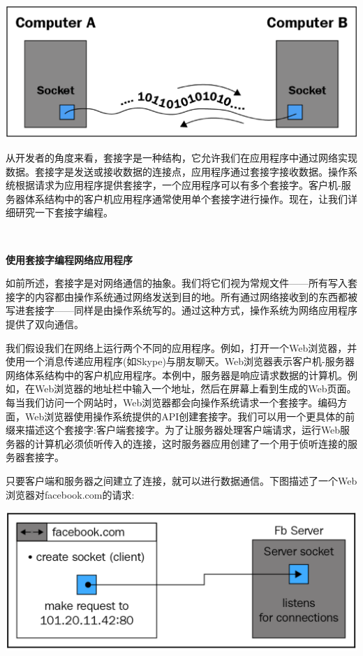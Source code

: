 \begin{center}
	\includegraphics[width=1.0\textwidth]{content/Section-2/Chapter-12/4}
\end{center}

从开发者的角度来看，套接字是一种结构，它允许我们在应用程序中通过网络实现数据。套接字是发送或接收数据的连接点，应用程序通过套接字接收数据。操作系统根据请求为应用程序提供套接字，一个应用程序可以有多个套接字。客户机-服务器体系结构中的客户机应用程序通常使用单个套接字进行操作。现在，让我们详细研究一下套接字编程。 \par

\noindent\textbf{}\ \par
\textbf{使用套接字编程网络应用程序} \ \par
如前所述，套接字是对网络通信的抽象。我们将它们视为常规文件——所有写入套接字的内容都由操作系统通过网络发送到目的地。所有通过网络接收到的东西都被写进套接字——同样是由操作系统写的。通过这种方式，操作系统为网络应用程序提供了双向通信。 \par
我们假设我们在网络上运行两个不同的应用程序。例如，打开一个Web浏览器，并使用一个消息传递应用程序(如Skype)与朋友聊天。Web浏览器表示客户机-服务器网络体系结构中的客户机应用程序。本例中，服务器是响应请求数据的计算机。例如，在Web浏览器的地址栏中输入一个地址，然后在屏幕上看到生成的Web页面。每当我们访问一个网站时，Web浏览器都会向操作系统请求一个套接字。编码方面，Web浏览器使用操作系统提供的API创建套接字。我们可以用一个更具体的前缀来描述这个套接字:客户端套接字。为了让服务器处理客户端请求，运行Web服务器的计算机必须侦听传入的连接，这时服务器应用创建了一个用于侦听连接的服务器套接字。 \par
只要客户端和服务器之间建立了连接，就可以进行数据通信。下图描述了一个Web浏览器对facebook.com的请求: \par

\begin{center}
	\includegraphics[width=1.0\textwidth]{content/Section-2/Chapter-12/5}
\end{center}

